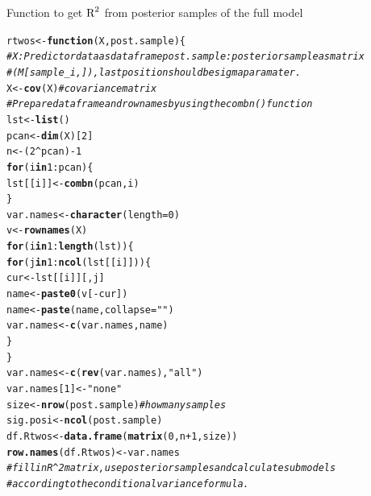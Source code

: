 \documentclass[11pt,a4paper,twoside]{book}\usepackage[]{graphicx}\usepackage[]{color}
\makeatletter
\newcommand{\hlnum}[1]{\textcolor[rgb]{0.686,0.059,0.569}{#1}}%
\newcommand{\hlstr}[1]{\textcolor[rgb]{0.192,0.494,0.8}{#1}}%
\newcommand{\hlcom}[1]{\textcolor[rgb]{0.678,0.584,0.686}{\textit{#1}}}%
\newcommand{\hlopt}[1]{\textcolor[rgb]{0,0,0}{#1}}%
\newcommand{\hlstd}[1]{\textcolor[rgb]{0.345,0.345,0.345}{#1}}%
\newcommand{\hlkwa}[1]{\textcolor[rgb]{0.161,0.373,0.58}{\textbf{#1}}}%
\newcommand{\hlkwb}[1]{\textcolor[rgb]{0.69,0.353,0.396}{#1}}%
\newcommand{\hlkwc}[1]{\textcolor[rgb]{0.333,0.667,0.333}{#1}}%
\newcommand{\hlkwd}[1]{\textcolor[rgb]{0.737,0.353,0.396}{\textbf{#1}}}%
\newenvironment{kframe}{%
 \def\at@end@of@kframe{}%
 \ifinner\ifhmode%
  \def\at@end@of@kframe{\end{minipage}}%
  \begin{minipage}{\columnwidth}%
 \fi\fi%
 \def\FrameCommand##1{\hskip\@totalleftmargin \hskip-\fboxsep
 \colorbox{shadecolor}{##1}\hskip-\fboxsep
     \hskip-\linewidth \hskip-\@totalleftmargin \hskip\columnwidth}%
 \MakeFramed {\advance\hsize-\width
   \@totalleftmargin\z@ \linewidth\hsize
   \@setminipage}}%
 {\par\unskip\endMakeFramed%
 \at@end@of@kframe}
\newenvironment{knitrout}{}{} %
\makeatother
\begin{document}
\vspace{15mm}


\begin{codeenv}
\caption{Function to get $\text{R}^2$ from posterior samples of the full model}\label{r03:LMG}
\begin{knitrout}
\color{fgcolor}\begin{kframe}
\begin{alltt}
\hlstd{rtwos} \hlkwb{<-} \hlkwa{function}\hlstd{(}\hlkwc{X}\hlstd{,} \hlkwc{post.sample}\hlstd{) \{}
    \hlcom{# X: Predictor data as data frame post.sample: posterior sample as matrix}
    \hlcom{# (M[sample_i,]), last position should be sigma paramater.}
    \hlstd{X} \hlkwb{<-} \hlkwd{cov}\hlstd{(X)}  \hlcom{#covariance matrix}
    \hlcom{# Prepare data frame and rownames by using the combn() function}
    \hlstd{lst} \hlkwb{<-} \hlkwd{list}\hlstd{()}
    \hlstd{pcan} \hlkwb{<-} \hlkwd{dim}\hlstd{(X)[}\hlnum{2}\hlstd{]}
    \hlstd{n} \hlkwb{<-} \hlstd{(}\hlnum{2}\hlopt{^}\hlstd{pcan)} \hlopt{-} \hlnum{1}
    \hlkwa{for} \hlstd{(i} \hlkwa{in} \hlnum{1}\hlopt{:}\hlstd{pcan) \{}
        \hlstd{lst[[i]]} \hlkwb{<-} \hlkwd{combn}\hlstd{(pcan, i)}
    \hlstd{\}}
    \hlstd{var.names} \hlkwb{<-} \hlkwd{character}\hlstd{(}\hlkwc{length} \hlstd{=} \hlnum{0}\hlstd{)}
    \hlstd{v} \hlkwb{<-} \hlkwd{rownames}\hlstd{(X)}
    \hlkwa{for} \hlstd{(i} \hlkwa{in} \hlnum{1}\hlopt{:}\hlkwd{length}\hlstd{(lst)) \{}
        \hlkwa{for} \hlstd{(j} \hlkwa{in} \hlnum{1}\hlopt{:}\hlkwd{ncol}\hlstd{(lst[[i]])) \{}
            \hlstd{cur} \hlkwb{<-} \hlstd{lst[[i]][, j]}
            \hlstd{name} \hlkwb{<-} \hlkwd{paste0}\hlstd{(v[}\hlopt{-}\hlstd{cur])}
            \hlstd{name} \hlkwb{<-} \hlkwd{paste}\hlstd{(name,} \hlkwc{collapse} \hlstd{=} \hlstr{" "}\hlstd{)}
            \hlstd{var.names} \hlkwb{<-} \hlkwd{c}\hlstd{(var.names, name)}
        \hlstd{\}}
    \hlstd{\}}
    \hlstd{var.names} \hlkwb{<-} \hlkwd{c}\hlstd{(}\hlkwd{rev}\hlstd{(var.names),} \hlstr{"all"}\hlstd{)}
    \hlstd{var.names[}\hlnum{1}\hlstd{]} \hlkwb{<-} \hlstr{"none"}
    \hlstd{size} \hlkwb{<-} \hlkwd{nrow}\hlstd{(post.sample)}  \hlcom{# how many samples}
    \hlstd{sig.posi} \hlkwb{<-} \hlkwd{ncol}\hlstd{(post.sample)}
    \hlstd{df.Rtwos} \hlkwb{<-} \hlkwd{data.frame}\hlstd{(}\hlkwd{matrix}\hlstd{(}\hlnum{0}\hlstd{, n} \hlopt{+} \hlnum{1}\hlstd{, size))}
    \hlkwd{row.names}\hlstd{(df.Rtwos)} \hlkwb{<-} \hlstd{var.names}
    \hlcom{# fill in R^2 matrix, use posterior samples and calculate submodels}
    \hlcom{# according to the conditional variance formula.}

\end{alltt}
\end{kframe}
\end{knitrout}
\end{codeenv}
\end{document}
